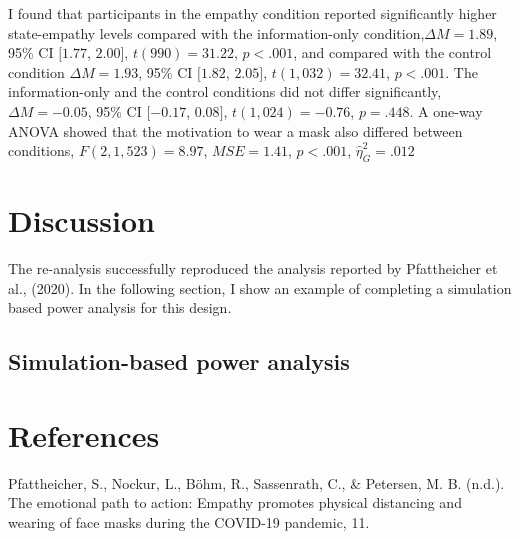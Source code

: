 \documentclass[
  english,
  man]{apa6}
\begin{document}
I found that participants in the empathy condition reported significantly higher state-empathy levels compared with the information-only condition,\(\Delta M = 1.89\), 95\% CI \([1.77\), \(2.00]\), \(t(990) = 31.22\), \(p < .001\), and compared with the control condition \(\Delta M = 1.93\), 95\% CI \([1.82\), \(2.05]\), \(t(1,032) = 32.41\), \(p < .001\). The information-only and the control conditions did not differ significantly, \(\Delta M = -0.05\), 95\% CI \([-0.17\), \(0.08]\), \(t(1,024) = -0.76\), \(p = .448\). A one-way ANOVA showed that the motivation to wear a mask also differed between conditions, \(F(2, 1,523) = 8.97\), \(\mathit{MSE} = 1.41\), \(p < .001\), \(\hat{\eta}^2_G = .012\)

\hypertarget{discussion}{%
\section{Discussion}\label{discussion}}

The re-analysis successfully reproduced the analysis reported by Pfattheicher et al., (2020). In the following section, I show an example of completing a simulation based power analysis for this design.

\hypertarget{simulation-based-power-analysis}{%
\subsection{Simulation-based power analysis}\label{simulation-based-power-analysis}}

\newpage

\hypertarget{references}{%
\section*{References}\label{references}}

\hypertarget{refs}{}
\leavevmode\hypertarget{ref-pfattheicher_emotional_nodate}{}%
Pfattheicher, S., Nockur, L., Böhm, R., Sassenrath, C., \& Petersen, M. B. (n.d.). The emotional path to action: Empathy promotes physical distancing and wearing of face masks during the COVID-19 pandemic, 11.
\end{document}
